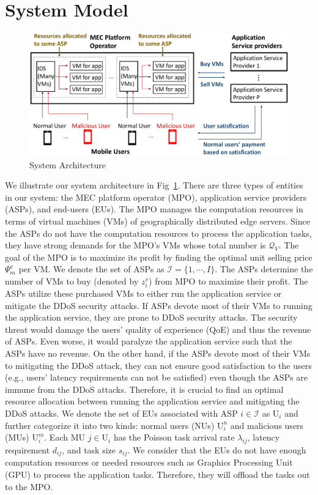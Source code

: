 \documentclass[conference]{IEEEtran}
\begin{document}
\section{System Model}\label{sec:system_model}
\begin{figure}[!ht]
\centering
\includegraphics[width= \columnwidth]{5GDDoS_Game_system_architecture.pdf}
\caption{System Architecture}
\label{fig:system}
\end{figure}
We illustrate our system architecture in Fig~\ref{fig:system}. There are three types of entities in our system: the MEC platform operator (MPO), application service providers (ASPs), and end-users (EUs). The MPO manages the computation resources in terms of virtual machines (VMs) of geographically distributed edge servers. Since the ASPs do not have the computation resources to process the application tasks, they have strong demands for the MPO's VMs whose total number is $\mathcal{Q}_{V}$. The goal of the MPO is to maximize its profit by finding the optimal unit selling price $\Psi_{m}^v$ per VM. We denote the set of ASPs as $\mathcal{I}=\{1, \cdots, I\}$. The ASPs determine the number of VMs to buy (denoted by $z_i^v$) from MPO to maximize their profit. The ASPs utilize these purchased VMs to either run the application service or mitigate the DDoS security attacks. If ASPs devote most of their VMs to running the application service, they are prone to DDoS security attacks. The security threat would damage the users' quality of experience (QoE) and thus the revenue of ASPs. Even worse, it would paralyze the application service such that the ASPs have no revenue. On the other hand, if the ASPs devote most of their VMs to mitigating the DDoS attack, they can not ensure good satisfaction to the users (e.g., users' latency requirements can not be satisfied) even though the ASPs are immune from the DDoS attacks. Therefore, it is crucial to find an optimal resource allocation between running the application service and mitigating the DDoS attacks. We denote the set of EUs associated with ASP $i \in \mathcal{I}$ as $\mathrm{U}_i$ and further categorize it into two kinds: normal users (NUs) $\mathrm{U}_i^n$ and malicious users (MUs) $\mathrm{U}_i^m$. Each MU $j \in \mathrm{U}_i$ has the Poisson task arrival rate $\lambda_{ij}$, latency requirement $d_{ij}$, and task size $s_{ij}$. We consider that the EUs do not have enough computation resources or needed resources such as Graphics Processing Unit (GPU) to process the application tasks. Therefore, they will offload the tasks out to the MPO.
\end{document}
